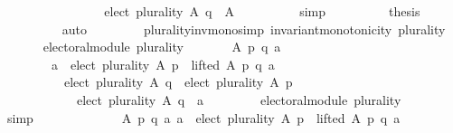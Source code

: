 \begin{isabellebody}
\isanewline
\ \ \ \ \ \ \isamarkupfalse%
\ \isamarkupfalse%
\isanewline
\ \ \ \ \ \ \ \ {\isachardoublequoteopen}elect\ plurality\ A\ q\ {\isasymsubseteq}\ A{\isachardoublequoteclose}\isanewline
\ \ \ \ \ \ \ \ \isamarkupfalse%
\ simp\isanewline
\ \ \ \ \ \ \isamarkupfalse%
\ \isamarkupfalse%
\ {\isacharquery}{\kern0pt}thesis\isanewline
\ \ \ \ \ \ \ \ \isamarkupfalse%
\ auto\isanewline
\ \ \ \ \isamarkupfalse%
\isanewline
\ \ \isamarkupfalse%
\isanewline
{}\isamarkupfalse%
%
\endisatagproof
{\isafoldproof}%
%
\isadelimproof
\isanewline
%
\endisadelimproof
\isanewline
\isanewline
{}\isamarkupfalse%
\ plurality{\isacharunderscore}{\kern0pt}inv{\isacharunderscore}{\kern0pt}mono{\isacharbrackleft}{\kern0pt}simp{\isacharbrackright}{\kern0pt}{\isacharcolon}{\kern0pt}\ {\isachardoublequoteopen}invariant{\isacharunderscore}{\kern0pt}monotonicity\ plurality{\isachardoublequoteclose}\isanewline
%
\isadelimproof
%
\endisadelimproof
%
\isatagproof
{}\isamarkupfalse%
\ {\isacharminus}{\kern0pt}\isanewline
\ \ \isamarkupfalse%
\isanewline
\ \ \ \ {\isachardoublequoteopen}electoral{\isacharunderscore}{\kern0pt}module\ plurality\ {\isasymand}\isanewline
\ \ \ \ \ \ {\isacharparenleft}{\kern0pt}{\isasymforall}A\ p\ q\ a{\isachardot}{\kern0pt}\isanewline
\ \ \ \ \ \ \ \ {\isacharparenleft}{\kern0pt}a\ {\isasymin}\ elect\ plurality\ A\ p\ {\isasymand}\ lifted\ A\ p\ q\ a{\isacharparenright}{\kern0pt}\ {\isasymlongrightarrow}\isanewline
\ \ \ \ \ \ \ \ \ \ {\isacharparenleft}{\kern0pt}elect\ plurality\ A\ q\ {\isacharequal}{\kern0pt}\ elect\ plurality\ A\ p\ {\isasymor}\isanewline
\ \ \ \ \ \ \ \ \ \ \ \ elect\ plurality\ A\ q\ {\isacharequal}{\kern0pt}\ {\isacharbraceleft}{\kern0pt}a{\isacharbraceright}{\kern0pt}{\isacharparenright}{\kern0pt}{\isacharparenright}{\kern0pt}{\isachardoublequoteclose}\isanewline
\ \ \isamarkupfalse%
\isanewline
\ \ \ \ \isamarkupfalse%
\ {\isachardoublequoteopen}electoral{\isacharunderscore}{\kern0pt}module\ plurality{\isachardoublequoteclose}\isanewline
\ \ \ \ \ \ \isamarkupfalse%
\ simp\isanewline
\ \ \isamarkupfalse%
\isanewline
\ \ \ \ \isamarkupfalse%
\isanewline
\ \ \ \ \ \ {\isachardoublequoteopen}{\isasymforall}A\ p\ q\ a{\isachardot}{\kern0pt}\ {\isacharparenleft}{\kern0pt}a\ {\isasymin}\ elect\ plurality\ A\ p\ {\isasymand}\ lifted\ A\ p\ q\ a{\isacharparenright}{\kern0pt}\ {\isasymlongrightarrow}\isanewline

\end{isabellebody}

